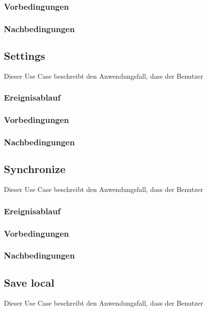 		\subsubsection{Vorbedingungen}
			
		\subsubsection{Nachbedingungen}
	
	\subsection{Settings}
		Dieser Use Case beschreibt den Anwendungsfall, dass der Benutzer 
			
		\subsubsection{Ereignisablauf}
	
		\subsubsection{Vorbedingungen}
			
		\subsubsection{Nachbedingungen}
	
	\subsection{Synchronize}
		Dieser Use Case beschreibt den Anwendungsfall, dass der Benutzer 
			
		\subsubsection{Ereignisablauf}
			
		\subsubsection{Vorbedingungen}
			
		\subsubsection{Nachbedingungen}
	
	\subsection{Save local}
		Dieser Use Case beschreibt den Anwendungsfall, dass der Benutzer 
			
